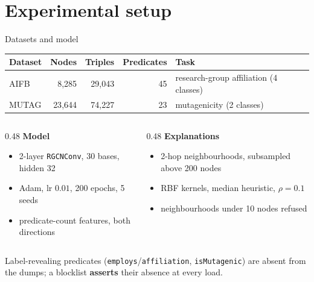 \documentclass[10pt,aspectratio=169]{beamer}
\begin{document}
\section{Experimental setup}

\begin{frame}{Datasets and model}
  \begin{table}
    \footnotesize
    \begin{tabular}{lrrrl}
      \toprule
      \textbf{Dataset} & \textbf{Nodes} & \textbf{Triples} & \textbf{Predicates} & \textbf{Task} \\
      \midrule
      AIFB  &  8{,}285 & 29{,}043 & 45 & research-group affiliation (4 classes) \\
      MUTAG & 23{,}644 & 74{,}227 & 23 & mutagenicity (2 classes) \\
      \bottomrule
    \end{tabular}
  \end{table}

  \vfill
  \begin{columns}[T,onlytextwidth]
    \begin{column}{0.48\textwidth}
      \textbf{Model}
      \begin{itemize}
        \item 2-layer \texttt{RGCNConv}, 30 bases, hidden 32
        \item Adam, lr $0.01$, 200 epochs, 5 seeds
        \item predicate-count features, both directions
      \end{itemize}
    \end{column}
    \begin{column}{0.48\textwidth}
      \textbf{Explanations}
      \begin{itemize}
        \item 2-hop neighbourhoods, subsampled above 200 nodes
        \item RBF kernels, median heuristic, $\rho = 0.1$
        \item neighbourhoods under 10 nodes refused
      \end{itemize}
    \end{column}
  \end{columns}

  \vfill
  \footnotesize
  Label-revealing predicates (\texttt{employs}/\texttt{affiliation},
  \texttt{isMutagenic}) are absent from the dumps; a blocklist
  \textbf{asserts} their absence at every load.
\end{frame}
\end{document}
